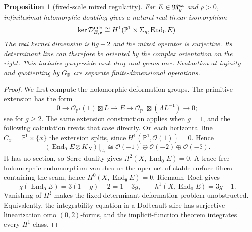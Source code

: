 \documentclass[11pt]{amsart}
\newtheorem{proposition}[theorem]{Proposition}
\theoremstyle{definition}
\theoremstyle{remark}
\theoremstyle{plain}
\newcommand{\RR}{\mathbb{R}}
\newcommand{\PP}{\mathbb{P}}
\newcommand{\cD}{\mathcal{D}}
\newcommand{\cO}{\mathcal{O}}
\newcommand{\frakM}{\mathfrak{M}}
\newcommand{\End}{\operatorname{End}}
\begin{document}
\begin{proposition}[fixed-scale mixed regularity]
\label{prop:fredholm-dolbeault}
For $E\in\frakM_g^{\rm sa}$ and $\rho>0$, infinitesimal holomorphic
doubling gives a natural real-linear isomorphism
\begin{equation}\label{eq:dolbeault-tangent-obstruction}
 \ker\cD^{\rm mix}_{E,\rho}
 \cong H^1(\PP^1\times\Sigma_g,\End_0E).
\end{equation}
The real kernel dimension is $6g-2$ and the mixed operator is
surjective. Its determinant line can therefore be oriented by the complex
orientation on the right. This includes gauge-side rank drop and genus
one. Evaluation at infinity and quotienting by $G_\RR$ are separate
finite-dimensional operations.
\end{proposition}

\begin{proof}
We first compute the holomorphic deformation groups. The primitive
extension has the form
\begin{equation}\label{eq:primitive-global-extension}
 0\longrightarrow\cO_{\PP^1}(1)\boxtimes L
 \longrightarrow E\longrightarrow
 \cO_{\PP^1}\boxtimes(\Lambda L^{-1})\longrightarrow0;
\end{equation}
see \cite[Proposition~2]{Munoz99b} for $g\geq2$. The same extension
construction applies when $g=1$, and the following calculation treats
that case directly. On each horizontal line
$C_x=\PP^1\times\{x\}$ the extension splits, since
$H^1(\PP^1,\cO(1))=0$. Hence
\[
 (\End_0E\otimes K_X)|_{C_x}
 \cong\cO(-1)\oplus\cO(-2)\oplus\cO(-3).
\]
It has no section, so Serre duality gives $H^2(X,\End_0E)=0$.
A trace-free holomorphic endomorphism vanishes on the open set of stable
surface fibers containing the seam, hence $H^0(X,\End_0E)=0$.
Riemann--Roch gives
\[
 \chi(\End_0E)=3(1-g)-2=1-3g,\qquad h^1(X,\End_0E)=3g-1.
\]
Vanishing of $H^2$ makes the fixed-determinant deformation problem
unobstructed. Equivalently, the integrability equation in a Dolbeault
slice has surjective linearization onto $(0,2)$-forms, and the
implicit-function theorem integrates every $H^1$ class.


\end{proof}
\end{document}
